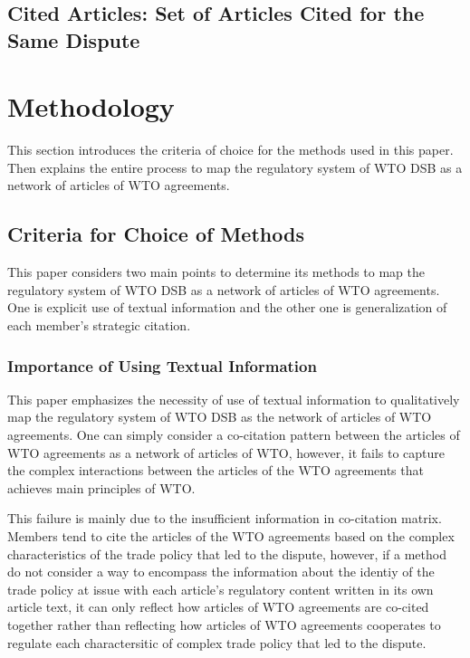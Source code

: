 \documentclass[12pt,letterpaper]{article}
\begin{document}
\subsection{Cited Articles: Set of Articles Cited for the Same Dispute}


\section{Methodology}
This section introduces the criteria of choice for the methods used in this paper. 
Then explains the entire process
to map the regulatory system of WTO DSB as a network of articles of WTO agreements.

\subsection{Criteria for Choice of Methods}
This paper considers two main points to
determine its methods to map the regulatory system of WTO DSB
as a network of articles of WTO agreements. 
One is explicit use of textual information and the other one is
generalization of each member's strategic citation.

\subsubsection{Importance of Using Textual Information}

This paper emphasizes the necessity of use of textual information 
to qualitatively map the regulatory system of WTO DSB as the network of articles of WTO agreements.
One can simply consider a co-citation pattern between the articles of WTO agreements as a network of articles of WTO, however,
it fails to capture the complex interactions between the articles of the WTO agreements that achieves main principles of WTO.

This failure is mainly due to the insufficient information in co-citation matrix. Members tend to cite the articles of 
the WTO agreements based on the complex characteristics of 
the trade policy that led to the dispute, however, if a method 
do not consider a way to encompass the information
about the identiy of the trade policy at issue with 
each article's regulatory content written in its own article text,
it can only reflect how articles of WTO agreements are co-cited 
together rather than reflecting how articles of WTO agreements 
cooperates to regulate each charactersitic of complex trade policy that led to the dispute. 
\end{document}
